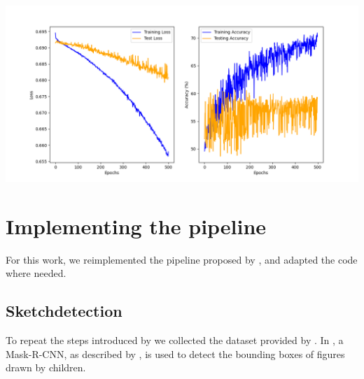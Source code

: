 \includegraphics[width=\textwidth]{Figures/NN_classifier_charts.png}

\section*{Implementing the pipeline}
For this work, we reimplemented the pipeline proposed by
\textcite{korpitsch-2023-sao}, and adapted the code where needed.

\subsection*{Sketchdetection}
To repeat the steps introduced by \textcite{korpitsch-2023-sao} we collected the
dataset provided by \textcite{sarvadevabhatla2017sketchparse}. In
\textcite{smith2023method}, a Mask-R-CNN, as described by \textcite{he2018mask},
is used to detect the bounding boxes of figures drawn by children. 
